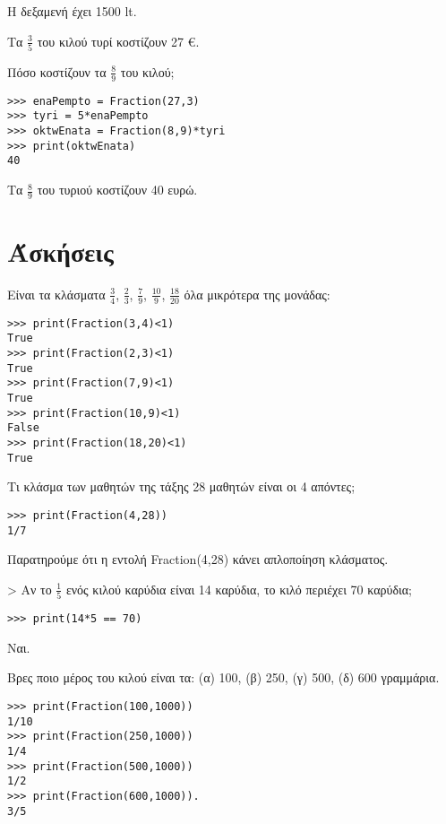 Η δεξαμενή έχει 1500 lt.

\begin{exercise}
Tα $\frac{3}{5}$ του κιλού τυρί κοστίζουν 27 €. 

Πόσο κοστίζουν τα $\frac{8}{9}$ του κιλού;
\end{exercise}

\begin{lstlisting}
>>> enaPempto = Fraction(27,3)
>>> tyri = 5*enaPempto
>>> oktwEnata = Fraction(8,9)*tyri
>>> print(oktwEnata)
40
\end{lstlisting}
Τα $\frac{8}{9}$ του τυριού κοστίζουν 40 ευρώ.
\section{Άσκήσεις}
\begin{exercise}
Είναι τα κλάσματα $\frac{3}{4}$, $\frac{2}{3}$, $\frac{7}{9}$, $\frac{10}{9}$, $\frac{18}{20}$ όλα μικρότερα της μονάδας:
\end{exercise}
\begin{lstlisting}
>>> print(Fraction(3,4)<1)
True
>>> print(Fraction(2,3)<1)
True
>>> print(Fraction(7,9)<1)
True
>>> print(Fraction(10,9)<1)
False
>>> print(Fraction(18,20)<1)
True
\end{lstlisting}

\begin{exercise}Τι κλάσμα των μαθητών της τάξης 28 μαθητών είναι οι 4 απόντες;\end{exercise}

\begin{lstlisting}
>>> print(Fraction(4,28))
1/7
\end{lstlisting}

Παρατηρούμε ότι η εντολή Fraction(4,28) κάνει απλοποίηση κλάσματος.

> Αν το $\frac{1}{5}$ ενός κιλού καρύδια είναι 14 καρύδια, το κιλό περιέχει 70 καρύδια;
\begin{lstlisting}
>>> print(14*5 == 70)
\end{lstlisting}
Ναι.

\begin{exercise}
Βρες ποιο μέρος του κιλού είναι τα: (α) 100, (β) 250, (γ) 500, (δ) 600 γραμμάρια.

\end{exercise}

\begin{lstlisting}
>>> print(Fraction(100,1000))
1/10
>>> print(Fraction(250,1000))
1/4
>>> print(Fraction(500,1000))
1/2
>>> print(Fraction(600,1000)).
3/5
\end{lstlisting}

